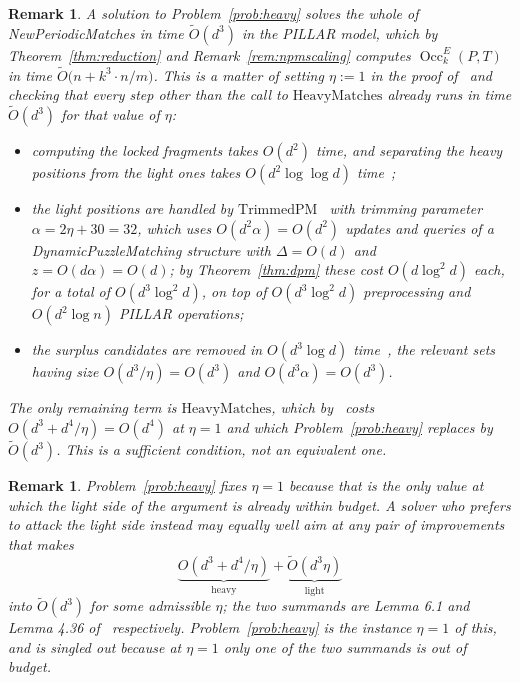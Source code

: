 \documentclass[10pt]{article}
\newtheorem{remark}[theorem]{Remark}
\newcommand{\Occ}{\operatorname{Occ}^E}
\newcommand{\PILLAR}{\textnormal{PILLAR}}
\newcommand{\NPM}{\textnormal{New\hspace{0pt}Periodic\hspace{0pt}Matches}}
\newcommand{\DPM}{\textnormal{Dynamic\hspace{0pt}Puzzle\hspace{0pt}Matching}}
\newcommand{\Ot}{\widetilde{O}}
\begin{document}
\begin{remark}\label{rem:heavyimplies}
A solution to Problem~\ref{prob:heavy} solves the whole of \NPM{} in time
$\Ot(d^3)$ in the \PILLAR{} model, which by
Theorem~\ref{thm:reduction} and Remark~\ref{rem:npmscaling} computes
$\Occ_k(P,T)$ in time $\Ot\bigl(n+k^3\cdot n/m\bigr)$. This is a matter of
setting $\eta:=1$ in the proof of~\cite[Lemma 1.3]{CKW22} and
checking that every step other than the call to $\mathrm{HeavyMatches}$ already
runs in time $\Ot(d^3)$ for that value of $\eta$:
\begin{itemize}
    \item computing the locked fragments takes $O(d^2)$ time, and separating
    the heavy positions from the light ones takes $O(d^2\log\log d)$
    time~\cite[Lemmas 5.4, 5.9]{CKW22};
    \item the light positions are handled by
    $\mathrm{TrimmedPM}$~\cite[Lemma 4.36]{CKW22} with trimming parameter
    $\alpha=2\eta+30=32$, which uses $O(d^2\alpha)=O(d^2)$ updates and queries
    of a \DPM{} structure with $\Delta=O(d)$ and $z=O(d\alpha)=O(d)$; by
    Theorem~\ref{thm:dpm} these cost $O(d\log^2d)$ each, for a total of
    $O(d^3\log^2d)$, on top of $O(d^3\log^2d)$ preprocessing and $O(d^2\log n)$
    \PILLAR{} operations;
    \item the surplus candidates are removed in $O(d^3\log d)$
    time~\cite[Claims 6.26, 6.27, 6.28]{CKW22}, the relevant sets having size
    $O(d^3/\eta)=O(d^3)$ and $O(d^3\alpha)=O(d^3)$.
\end{itemize}
The only remaining term is $\mathrm{HeavyMatches}$, which
by~\cite[Lemma 6.1]{CKW22} costs $O(d^3+d^4/\eta)=O(d^4)$ at $\eta=1$ and which
Problem~\ref{prob:heavy} replaces by $\Ot(d^3)$. This is a sufficient
condition, not an equivalent one.
\end{remark}

\begin{remark}\label{rem:otherroutes}
Problem~\ref{prob:heavy} fixes $\eta=1$ because that is the only value at which
the light side of the argument is already within budget. A solver who prefers to attack the
light side instead may equally well aim at any pair of improvements that makes
\[
\underbrace{O(d^3+d^4/\eta)}_{\text{heavy}}+\underbrace{\Ot(d^3\eta)}_{\text{light}}
\]
into $\Ot(d^3)$ for some admissible $\eta$; the two summands are
Lemma 6.1 and Lemma 4.36 of~\cite{CKW22} respectively. Problem~\ref{prob:heavy}
is the instance $\eta=1$ of this, and is singled out because at $\eta=1$ only
one of the two summands is out of budget.
\end{remark}
\end{document}
